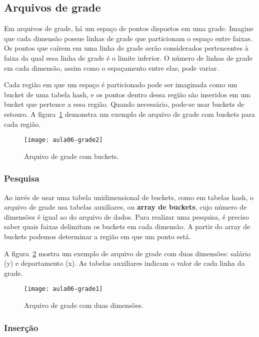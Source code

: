 \subsection{Arquivos de grade}

Em arquivos de grade, há um espaço de pontos dispostos em uma grade.
Imagine que cada dimensão possue linhas de grade 
que particionam o espaço entre faixas.
Os pontos que caírem em uma linha de grade serão considerados pertencentes
à faixa da qual essa linha de grade é o limite inferior.
O número de linhas de grade em cada dimensão, assim como o espaçamento entre elas,
pode variar.

Cada região em que um espaço é particionado pode ser imaginada como um bucket
de uma tabela hash, e os pontos dentro dessa região são inseridos em um bucket
que pertence a essa região. Quando necessário, pode-se usar buckets de estouro.
A figura~\ref{aula06:fig:grade2} demonstra um exemplo de arquivo de grade
com buckets para cada região.
%
\begin{figure}[!htb]
\centering
\texttt{[image: aula06-grade2]}
\caption{Arquivo de grade com buckets.}
\label{aula06:fig:grade2}
\end{figure}

\subsubsection{Pesquisa}

Ao invés de usar uma tabela unidimensional de buckets, como em tabelas hash, 
o arquivo de grade usa tabelas auxiliares, ou \textbf{array de buckets}, cujo
número de dimensões é igual ao do arquivo de dados. 
Para realizar uma pesquisa, é preciso saber quais faixas delimitam os buckets
em cada dimensão.
A partir do array de buckets podemos determinar a região em que um ponto está.

A figura~\ref{aula06:fig:grade1} mostra um exemplo de arquivo de grade
com duas dimensões: salário (y) e departamento (x). 
As tabelas auxiliares indicam o valor de cada linha da grade.
%
\begin{figure}[!htb]
\centering
\texttt{[image: aula06-grade1]}
\caption{Arquivo de grade com duas dimensões.}
\label{aula06:fig:grade1}
\end{figure}

\subsubsection{Inserção}

